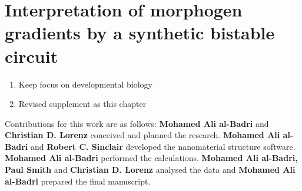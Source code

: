 \chapter{Interpretation of morphogen gradients by a synthetic bistable circuit}
\label{chapter:double-exclusive}
\vspace{-9mm}
\begin{enumerate}
    \item Keep focus on developmental biology
    \item Revised supplement as this chapter
\end{enumerate}
Contributions for this work are as follows: \textbf{Mohamed Ali al-Badri} and \textbf{Christian D. Lorenz} conceived and planned the research. \textbf{Mohamed Ali al-Badri} and \textbf{Robert C. Sinclair} developed the nanomaterial structure software. \textbf{Mohamed Ali al-Badri} performed the calculations. \textbf{Mohamed Ali al-Badri, Paul Smith} and \textbf{Christian D. Lorenz} analysed the data and \textbf{Mohamed Ali al-Badri} prepared the final manuscript.

